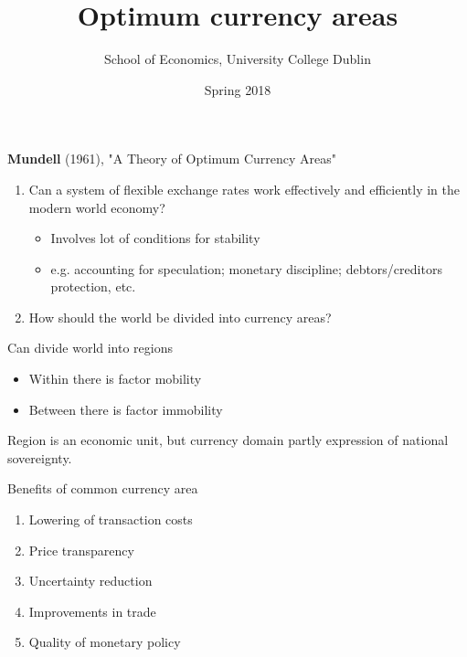 \documentclass{beamer}
\title{Optimum currency areas}
\author{School of Economics, University College Dublin}
\date{Spring 2018}
\begin{document}
\begin{frame}
 \titlepage
\end{frame}

\begin{frame}
  \textbf{Mundell} (1961), "A Theory of Optimum Currency Areas"
  \medskip
  \begin{enumerate}
    \item Can a system of flexible exchange rates work effectively and efficiently in the modern world economy?   
    \begin{itemize}
       \item Involves lot of conditions for stability
       \item e.g. accounting for speculation; monetary discipline; debtors/creditors protection, etc.
     \end{itemize} 
    \item How should the world be divided into currency areas?    
  \end{enumerate}
  \medskip
  Can divide world into regions
  \begin{itemize}
     \item Within there is factor mobility
     \item Between there is factor immobility
   \end{itemize} 
   \medskip
  Region is an economic unit, but currency domain partly expression of national sovereignty.
\end{frame}


\begin{frame}
  Benefits of common currency area
  \begin{enumerate}
    \item Lowering of transaction costs
    \item Price transparency
    \item Uncertainty reduction
    \item Improvements in trade
    \item Quality of monetary policy
  \end{enumerate}
\end{frame}
\end{document}
